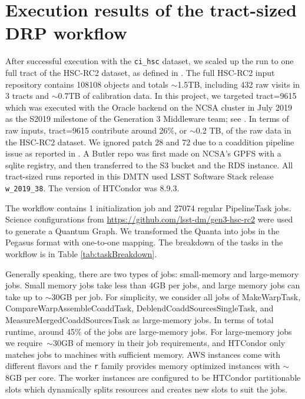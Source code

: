 \section{Execution results of the tract-sized DRP workflow}
\label{results}

After successful execution with the \texttt{ci\_hsc} dataset, we scaled up the run to one full tract of the HSC-RC2 dataset, as defined in .
The full HSC-RC2 input repository contains 108108 objects and totals $\sim$1.5TB, including 432 raw visits in 3 tracts and $\sim$0.7TB of calibration data.
In this project, we targeted tract=9615 which was executed with the Oracle backend on the NCSA cluster in July 2019 as the S2019 milestone of the Generation 3 Middleware team; see .
In terms of raw inputs, tract=9615 contribute around 26$\%$, or $\sim$0.2 TB, of the raw data in the HSC-RC2 dataset.
We ignored patch 28 and 72 due to a coaddition pipeline issue as reported in .
A Butler repo was first made on NCSA's GPFS with a sqlite registry, and then transferred to the S3 bucket and the RDS instance.
All tract-sized runs reported in this DMTN used LSST Software Stack release \texttt{w\_2019\_38}.
The version of HTCondor was 8.9.3.

The workflow contains 1 initialization job and 27074 regular PipelineTask jobs.
Science configurations from \url{https://github.com/lsst-dm/gen3-hsc-rc2} were used to generate a Quantum Graph.
We transformed the Quanta into jobs in the Pegasus format with one-to-one mapping.
The breakdown of the tasks in the workflow is in Table \ref{tab:taskBreakdown}.



Generally speaking, there are two types of jobs: small-memory and large-memory jobs.
Small memory jobs take less than 4GB per jobs, and large memory jobs can take up to $\sim$30GB per job.
For simplicity, we consider all jobs of MakeWarpTask, CompareWarpAssembleCoaddTask, DeblendCoaddSourcesSingleTask, and MeasureMergedCoaddSourcesTask as large-memory jobs.
In terms of total runtime, around 45\% of the jobs are large-memory jobs.
For large-memory jobs we require~$\sim$30GB of memory in their job requirements, and HTCondor only matches jobs to machines with sufficient memory.
AWS instances come with different flavors and the \texttt{r} family provides memory optimized instances with $\sim$8GB per core.
The worker instances are configured to be HTCondor partitionable slots which dynamically splits resources and creates new slots to suit the jobs.

